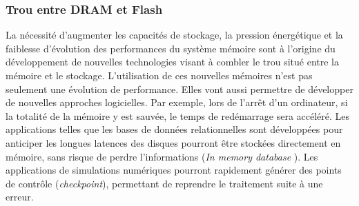     \subsubsection{Trou entre DRAM et Flash}

        La nécessité d'augmenter les capacités de stockage, la pression énergétique et la faiblesse d'évolution des performances du système mémoire sont à l'origine du développement de nouvelles technologies visant à combler le trou situé entre la mémoire et le stockage. L'utilisation de ces nouvelles mémoires n'est pas seulement une évolution de performance. Elles vont aussi permettre de développer de nouvelles approches logicielles. Par exemple, lors de l'arrêt d'un ordinateur, si la totalité de la mémoire y est sauvée, le temps de redémarrage sera accéléré. Les applications telles que les bases de données relationnelles sont développées pour anticiper les longues latences des disques pourront être stockées directement en mémoire, sans risque de perdre l'informations (\textit{In memory database} \cite{Oukid2015}). Les applications de simulations numériques pourront rapidement générer des points de contrôle (\textit{checkpoint}), permettant de reprendre le traitement suite à une erreur. 
        
        
        
